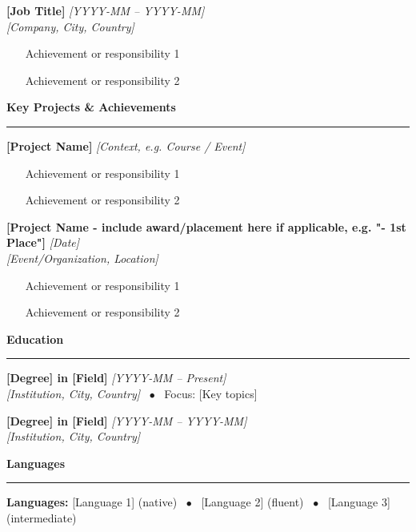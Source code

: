 \documentclass[10pt,a4paper]{article}
\newcommand{\sectiontitle}[1]{
    \vspace{0.2cm}
    \textcolor{primarycolor}{\large\textbf{#1}}
    \par\noindent\textcolor{primarycolor}{\rule{\textwidth}{0.8pt}}
    \vspace{0.05cm}
}
\newcommand{\daterange}[1]{{\textcolor{secondarycolor}{\textit{#1}}}}
\newcommand{\jobtitle}[1]{{\textbf{#1}}}
\newcommand{\organization}[1]{{\textit{#1}}}
\newcommand{\entryseparator}{\vspace{0.1cm}}
\begin{document}
\jobtitle{[Job Title]} \hfill \daterange{[YYYY-MM -- YYYY-MM]}\\
\organization{[Company, City, Country]}
\begin{itemize}[leftmargin=*,noitemsep,topsep=0.05cm,parsep=0pt]
    \item [Achievement or responsibility 1]
    \item [Achievement or responsibility 2]
\end{itemize}

\sectiontitle{Key Projects \& Achievements}
\vspace{-0.05cm}
\jobtitle{[Project Name]} \hfill \daterange{[Context, e.g. Course / Event]}
\begin{itemize}[leftmargin=*,noitemsep,topsep=0.05cm,parsep=0pt]
    \item [Achievement or responsibility 1]
    \item [Achievement or responsibility 2]
\end{itemize}

\entryseparator

\jobtitle{[Project Name - include award/placement here if applicable, e.g. "- 1st Place"]} \hfill \daterange{[Date]}\\
\organization{[Event/Organization, Location]}
\begin{itemize}[leftmargin=*,noitemsep,topsep=0.05cm,parsep=0pt]
    \item [Achievement or responsibility 1]
    \item [Achievement or responsibility 2]
\end{itemize}

\sectiontitle{Education}
\vspace{-0.05cm}
\jobtitle{[Degree] in [Field]} \hfill \daterange{[YYYY-MM -- Present]}\\
\organization{[Institution, City, Country]} \ $\bullet$ \ Focus: [Key topics]

\entryseparator

\jobtitle{[Degree] in [Field]} \hfill \daterange{[YYYY-MM -- YYYY-MM]}\\
\organization{[Institution, City, Country]}

\sectiontitle{Languages}
\vspace{-0.05cm}
\small
\textbf{Languages:} [Language 1] (native) \ $\bullet$ \ [Language 2] (fluent) \ $\bullet$ \ [Language 3] (intermediate)
\end{document}
